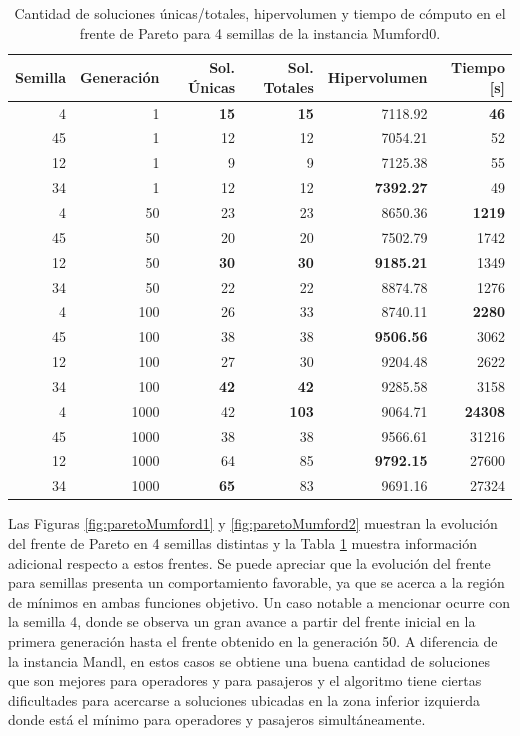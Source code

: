 \begin{table}[!htb]
\centering
\begin{tabular}{|r|r|r|r|r|r|}
\hline
Semilla & Generación & Sol. Únicas & Sol. Totales & Hipervolumen & Tiempo [s]\\  
\hline \hline
4 & 1 & \textbf{15} & \textbf{15} & 7118.92 & \textbf{46} \\ \hline
45 & 1 & 12 & 12 & 7054.21 & 52 \\ \hline
12 & 1 & 9 & 9 & 7125.38 & 55 \\ \hline
34 & 1 & 12 & 12 & \textbf{7392.27} & 49 \\ \hline\hline
4 & 50 & 23 & 23 & 8650.36 & \textbf{1219} \\ \hline
45 & 50 & 20 & 20 & 7502.79 & 1742 \\ \hline
12 & 50 & \textbf{30} & \textbf{30} & \textbf{9185.21} & 1349 \\ \hline
34 & 50 & 22 & 22 & 8874.78 & 1276 \\ \hline\hline
4 & 100 & 26 & 33 & 8740.11 & \textbf{2280} \\ \hline
45 & 100 & 38 & 38 & \textbf{9506.56} & 3062 \\ \hline
12 & 100 & 27 & 30 & 9204.48 & 2622 \\ \hline
34 & 100 & \textbf{42} & \textbf{42} & 9285.58 & 3158 \\ \hline\hline
4 & 1000 & 42 & \textbf{103} & 9064.71 & \textbf{24308} \\ \hline
45 & 1000 & 38 & 38 & 9566.61 & 31216 \\ \hline
12 & 1000 & 64 & 85 & \textbf{9792.15} & 27600 \\ \hline
34 & 1000 & \textbf{65} & 83 & 9691.16 & 27324 \\ \hline
\end{tabular}
\caption{Cantidad de soluciones únicas/totales, hipervolumen y tiempo de cómputo en el frente de Pareto para 4 semillas de la instancia Mumford0.}
\label{tab:dataFrenteMumford0}

\vspace{0.7cm}

\end{table}

Las Figuras \ref{fig:paretoMumford1} y \ref{fig:paretoMumford2} muestran la evolución del frente de Pareto en 4 semillas distintas y la Tabla \ref{tab:dataFrenteMumford0} muestra información adicional respecto a estos frentes. Se puede apreciar que la evolución del frente para semillas presenta un comportamiento favorable, ya que se acerca a la región de mínimos en ambas funciones objetivo. Un caso notable a mencionar ocurre con la semilla 4, donde se observa un gran avance a partir del frente inicial en la primera generación hasta el frente obtenido en la generación 50. A diferencia de la instancia Mandl, en estos casos se obtiene una buena cantidad de soluciones que son mejores para operadores y para pasajeros y el algoritmo tiene ciertas dificultades para acercarse a soluciones ubicadas en la zona inferior izquierda donde está el mínimo para operadores y pasajeros simultáneamente.

